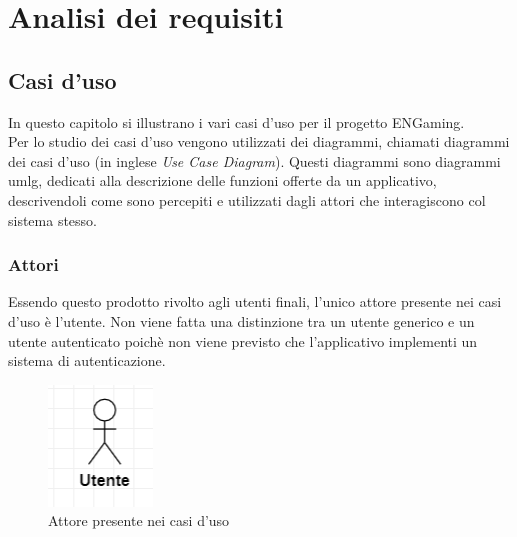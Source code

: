 
\chapter{Analisi dei requisiti}
\label{cap:analisi-requisiti}

\section{Casi d'uso}

In questo capitolo si illustrano i vari casi d'uso per il progetto ENGaming.\\
Per lo studio dei casi d'uso vengono utilizzati dei diagrammi, chiamati diagrammi dei casi d'uso (in inglese \emph{Use Case Diagram}).
Questi diagrammi sono diagrammi \gls{umlg}, dedicati alla descrizione delle funzioni offerte da un applicativo, descrivendoli come sono percepiti e utilizzati dagli attori che interagiscono col sistema stesso.

\subsection{Attori}

Essendo questo prodotto rivolto agli utenti finali, l'unico attore presente nei casi d'uso è l'utente.
Non viene fatta una distinzione tra un utente generico e un utente autenticato poichè non viene previsto che l'applicativo implementi un sistema di autenticazione.

\begin{figure}[h]
    \centering
    \includegraphics{images/usecase/attore.png}
    \caption{Attore presente nei casi d'uso}
    \label{fig:attore}
\end{figure}
\newpage
